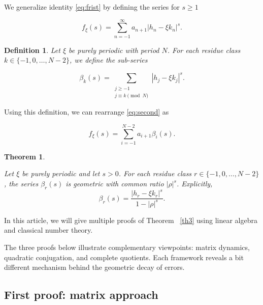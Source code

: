 \documentclass[]{interact}
\theoremstyle{plain}
\numberwithin{equation}{section} %
\newtheorem{theorem}[thm]{Theorem}
\newtheorem{definition}[thm]{Definition}
\numberwithin{table}{section} %
\numberwithin{figure}{section}
\begin{document}
We generalize identity \eqref{eq:frist} by defining the series for $s \ge 1$


\begin{equation}
f_{\xi}(s)=\sum_{n=-1}^{\infty}a_{n+1}|h_n-\xi k_n|^s.  
\label{eq:second}
\end{equation}






\begin{definition}


 Let $\xi$ be purely periodic with period $N$. For each residue class $k \in \{-1, 0, \dots, N-2\}$, we define the sub-series
 
 $$\beta_{k}(s) = \sum_{\substack{j \ge -1 \\ j \equiv k \pmod N}} |h_j-\xi k_j|^s.$$
 

    
\end{definition}

 
 
 Using this definition, we can rearrange \eqref{eq:second} as
 
 
 $$f_{\xi}(s)=\sum_{i=-1}^{N-2} a_{i+1} \beta_{i}(s).$$
 

\begin{theorem}\label{th4}


Let $\xi$ be purely periodic and let $s>0$.
For each residue class \(r\in\{-1,0,\dots,N-2\}\), the series \(\beta_r(s)\) is geometric with
common ratio $|\rho|^s$. Explicitly,
\[ \beta_r(s)=\frac{|h_r-\xi k_r|^s}{1-|\rho|^s}. \]
    
\end{theorem}





In this article, we will give multiple proofs of Theorem ~\ref{th3} using linear algebra and classical number theory. 

The three proofs below illustrate complementary viewpoints:
matrix dynamics, quadratic conjugation, and complete quotients.
Each framework reveals a bit different mechanism behind the geometric decay of errors.  
    
\subsection{First proof: matrix approach}
\end{document}
